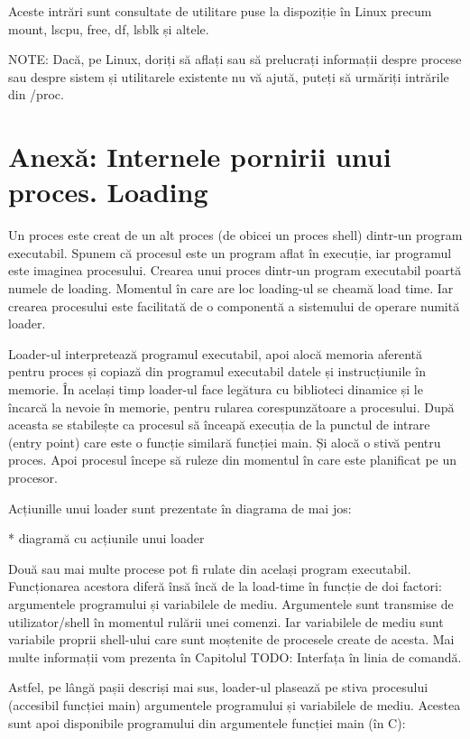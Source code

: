 Aceste intrări sunt consultate de utilitare puse la dispoziție în Linux precum
mount, lscpu, free, df, lsblk și altele.

NOTE: Dacă, pe Linux, doriți să aflați sau să prelucrați informații despre
procese sau despre sistem și utilitarele existente nu vă ajută, puteți să
urmăriți intrările din /proc.

\section{Anexă: Internele pornirii unui proces. Loading}
\label{sec:procese-loading}

Un proces este creat de un alt proces (de obicei un proces shell) dintr-un
program executabil. Spunem că procesul este un program aflat în execuție, iar
programul este imaginea procesului. Crearea unui proces dintr-un program
executabil poartă numele de loading. Momentul în care are loc loading-ul se
cheamă load time. Iar crearea procesului este facilitată de o componentă a
sistemului de operare numită loader.

Loader-ul interpretează programul executabil, apoi alocă memoria aferentă pentru
proces și copiază din programul executabil datele și instrucțiunile în memorie.
În același timp loader-ul face legătura cu biblioteci dinamice și le încarcă la
nevoie în memorie, pentru rularea corespunzătoare a procesului. După aceasta se
stabilește ca procesul să înceapă execuția de la punctul de intrare (entry
point) care este o funcție similară funcției main. Și alocă o stivă pentru
proces. Apoi procesul începe să ruleze din momentul în care este planificat pe
un procesor.

Acțiunille unui loader sunt prezentate în diagrama de mai jos:

* diagramă cu acțiunile unui loader

Două sau mai multe procese pot fi rulate din același program executabil.
Funcționarea acestora diferă însă încă de la load-time în funcție de doi
factori: argumentele programului și variabilele de mediu. Argumentele sunt
transmise de utilizator/shell în momentul rulării unei comenzi. Iar variabilele
de mediu sunt variabile proprii shell-ului care sunt moștenite de procesele
create de acesta. Mai multe informații vom prezenta în Capitolul TODO: Interfața
în linia de comandă.

Astfel, pe lângă pașii descriși mai sus, loader-ul plasează pe stiva procesului
(accesibil funcției main) argumentele programului și variabilele de mediu.
Acestea sunt apoi disponibile programului din argumentele funcției main (în C):

